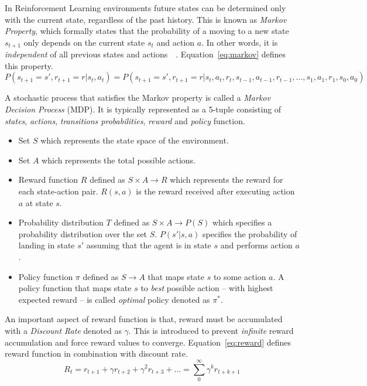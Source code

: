 In Reinforcement Learning environments future states can be determined only with the current state, regardless of the past history. This is known as \emph{Markov Property}, which formally states that the probability of a moving to a new state $s_{t+1}$ only depends on the current state $s_t$ and action $a$. In other words, it is \emph{independent} of all previous states and actions~\cite{rlIntro}~\cite{Lorido-Botran2014}. Equation~\ref{eq:markov} defines this property.
\begin{equation}
P(s_{t+1} = s',r_{t+1} = r | s_t,a_t) = P(s_{t+1} = s',r_{t+1} = r | s_t,a_t,r_t,s_{t-1},a_{t-1},r_{t-1},\dots,s_1,a_1,r_1,s_0,a_0)
\label{eq:markov}
\end{equation}

A stochastic process that satisfies the Markov property is called a \emph{Markov Decision Process} (MDP). It is typically represented as a 5-tuple consisting of \emph{states}, \emph{actions}, \emph{transitions probabilities}, \emph{reward} and \emph{policy} function.
\begin{itemize}
    \item Set $S$ which represents the state space of the environment.
    \item Set $A$ which represents the total possible actions.
    \item Reward function $R$ defined as $S \times A \rightarrow R$ which represents the reward for each state-action pair. $R(s,a)$ is the reward received after executing action $a$ at state $s$.
    \item Probability distribution $T$ defined as $S \times A \rightarrow P(S)$ which specifies a probability distribution over the set $S$. $P(s'|s,a)$ specifies the probability of landing in state $s'$ assuming that the agent is in state $s$ and performs action $a$.
    \item Policy function $\pi$ defined as $S \rightarrow A$ that maps state $s$ to some action $a$. A policy function that maps state $s$ to \emph{best} possible action -- with highest expected reward -- is called \emph{optimal} policy denoted as $\pi^*$.
\end{itemize}

An important aspect of reward function is that, reward must be accumulated with a \emph{Discount Rate} denoted as $\gamma$. This is introduced to prevent \emph{infinite} reward accumulation and force reward values to converge. Equation~\ref{eq:reward} defines reward function in combination with discount rate.
\begin{equation}
R_t = r_{t+1}+\gamma r_{t+2}+\gamma^2 r_{t+3}+\dots=\sum_{0}^{\infty}\gamma^k r_{t+k+1}
\label{eq:reward}
\end{equation}

